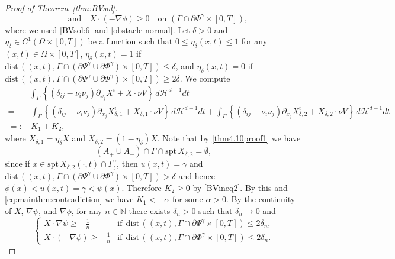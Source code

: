 \documentclass{amsart}
\theoremstyle{definition}
\newcommand{\spt}{\mathrm{spt}\,}
\newcommand{\dist}{\mathrm{dist}\,}
\begin{document}
\begin{proof}[Proof of Theorem~\ref{thm:BVsol}]
\begin{equation}
	\quad
	\text{and}
	\quad
	X \cdot (-\nabla \phi) \geq 0 \quad \text{on } (\Gamma \cap \partial \Phi ^\gamma \times [0,T]),
\end{equation}
where we used \eqref{BVsol:6} and \eqref{obstacle-normal}.
Let $\delta>0$ and $\eta_\delta \in C^1 (\Omega \times [0,T])$ be a function such that $0\leq \eta_\delta (x,t)\leq 1$ for any $(x,t) \in \Omega\times [0,T]$, $\eta_\delta (x,t)=1$ if $ \dist ((x,t), \Gamma \cap (\partial \Psi^\gamma \cup \partial \Phi^\gamma) \times [0,T]) \leq \delta$, and
$\eta _\delta (x,t) =0$ if
$ \dist ((x,t), \Gamma \cap (\partial \Psi^\gamma \cup \partial \Phi^\gamma) \times [0,T]) \geq 2\delta$. We compute
\begin{equation*}
\begin{split}
&\int_{\Gamma }
\left\{
\left( \delta_{ij} - \nu_i \nu_j \right)
\partial_{x_j} X^i +
X \cdot \nu V 
\right\} \, d \mathcal{H}^{d-1} dt \\
= & \,
\int_{\Gamma } \left\{
\left( \delta_{ij} - \nu_i \nu_j \right)
\partial_{x_j} X^i _{\delta,1} +
 X_{\delta,1} \cdot \nu V 
\right\} \, d \mathcal{H}^{d-1} dt
+
\int_{\Gamma }
\left\{
\left( \delta_{ij} - \nu_i \nu_j \right)
\partial_{x_j} X^i _{\delta,2} +
X_{\delta,2} \cdot \nu V 
\right\} \, d \mathcal{H}^{d-1} dt\\
=: & \, K_1 +K_2,
\end{split}
\end{equation*}
where $X_{\delta,1}=\eta_\delta X$ and $X_{\delta,2} =(1-\eta_\delta) X$.
Note that by \eqref{thm4.10proof1} we have
\[
(A_+ \cup A_-) \cap \Gamma \cap \spt X_{\delta,2}=\emptyset,
\]
since if $x \in \spt X_{\delta,2}(\cdot,t) \cap \Gamma_t ^\gamma$, then 
$u (x,t)=\gamma$ and $ \dist ((x,t), \Gamma \cap (\partial \Psi^\gamma \cup \partial \Phi^\gamma) \times [0,T]) > \delta$ and hence $\phi (x) < u(x,t)=\gamma <\psi (x)$.
Therefore $K_2 \geq 0$ by \eqref{BVineq2}. By this and \eqref{eq:mainthm:contradiction} we have $K_1 < -\alpha$ for some $\alpha>0$. 
By the continuity of $X$, $\nabla \psi$, and $\nabla \phi$, for any $n\in \mathbb{N}$ there exists $\delta_n >0$ such that $\delta_n \to 0$ and
\begin{equation*}
	\begin{cases}
    X\cdot \nabla \psi \geq -\frac{1}{n} & \text{if} \ \ \dist ((x,t),\Gamma\cap \partial \Psi^\gamma \times[0,T])\leq 2\delta_n, \\
	X \cdot (-\nabla \phi) \geq -\frac{1}{n} & \text{if} \ \ \dist((x,t), \Gamma \cap \partial \Phi^\gamma \times [0,T])\leq 2\delta_n.
    \end{cases}

\end{equation*}
\end{proof}
\end{document}
